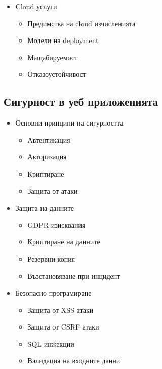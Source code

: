 \documentclass[12pt,a4paper]{article}
\begin{document}
\begin{itemize}
\begin{itemize}
        \item Cloud услуги
        \begin{itemize}
            \item Предимства на cloud изчисленията
            \item Модели на deployment
            \item Мащабируемост
            \item Отказоустойчивост
        \end{itemize}
    \end{itemize}
\end{itemize}

\subsection{Сигурност в уеб приложенията}
\begin{itemize}
    \item Основни принципи на сигурността
    \begin{itemize}
        \item Автентикация
        \item Авторизация
        \item Криптиране
        \item Защита от атаки
    \end{itemize}
    
    \item Защита на данните
    \begin{itemize}
        \item GDPR изисквания
        \item Криптиране на данните
        \item Резервни копия
        \item Възстановяване при инцидент
    \end{itemize}
    
    \item Безопасно програмиране
    \begin{itemize}
        \item Защита от XSS атаки
        \item Защита от CSRF атаки
        \item SQL инжекции
        \item Валидация на входните данни
    \end{itemize}
\end{itemize}
\end{document}
